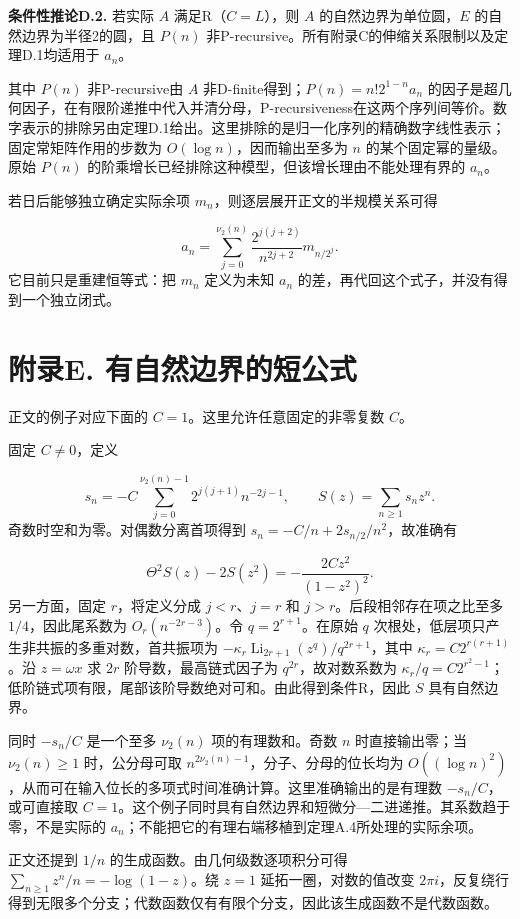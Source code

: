 \documentclass[12pt,a4paper]{article}
\begin{document}
\textbf{条件性推论D.2.} 若实际 $A$ 满足R（$C=L$），则 $A$ 的自然边界为单位圆，$E$ 的自然边界为半径2的圆，且 $P(n)$ 非P-recursive。所有附录C的伸缩关系限制以及定理D.1均适用于 $a_n$。

其中 $P(n)$ 非P-recursive由 $A$ 非D-finite得到；$P(n)=n!2^{1-n}a_n$ 的因子是超几何因子，在有限阶递推中代入并清分母，P-recursiveness在这两个序列间等价。数字表示的排除另由定理D.1给出。这里排除的是归一化序列的精确数字线性表示；固定常矩阵作用的步数为 $O(\log n)$，因而输出至多为 $n$ 的某个固定幂的量级。原始 $P(n)$ 的阶乘增长已经排除这种模型，但该增长理由不能处理有界的 $a_n$。

若日后能够独立确定实际余项 $m_n$，则逐层展开正文的半规模关系可得

\[
a_n=\sum_{j=0}^{\nu_2(n)}\frac{2^{j(j+2)}}{n^{2j+2}}m_{n/2^j}.
\]
它目前只是重建恒等式：把 $m_n$ 定义为未知 $a_n$ 的差，再代回这个式子，并没有得到一个独立闭式。

\section*{附录E. 有自然边界的短公式}
正文的例子对应下面的 $C=1$。这里允许任意固定的非零复数 $C$。

固定 $C\ne0$，定义

\[
s_n=-C\sum_{j=0}^{\nu_2(n)-1}2^{j(j+1)}n^{-2j-1},\qquad S(z)=\sum_{n\ge1}s_nz^n.
\]
奇数时空和为零。对偶数分离首项得到 $s_n=-C/n+2s_{n/2}/n^2$，故准确有

\[
\Theta^2S(z)-2S(z^2)=-\frac{2Cz^2}{(1-z^2)^2}.
\]
另一方面，固定 $r$，将定义分成 $j<r$、$j=r$ 和 $j>r$。后段相邻存在项之比至多 $1/4$，因此尾系数为 $O_r(n^{-2r-3})$。令 $q=2^{r+1}$。在原始 $q$ 次根处，低层项只产生非共振的多重对数，首共振项为 $-\kappa_r\operatorname{Li}_{2r+1}(z^q)/q^{2r+1}$，其中 $\kappa_r=C2^{r(r+1)}$。沿 $z=\omega x$ 求 $2r$ 阶导数，最高链式因子为 $q^{2r}$，故对数系数为 $\kappa_r/q=C2^{r^2-1}$；低阶链式项有限，尾部该阶导数绝对可和。由此得到条件R，因此 $S$ 具有自然边界。

同时 $-s_n/C$ 是一个至多 $\nu_2(n)$ 项的有理数和。奇数 $n$ 时直接输出零；当 $\nu_2(n)\ge1$ 时，公分母可取 $n^{2\nu_2(n)-1}$，分子、分母的位长均为 $O((\log n)^2)$，从而可在输入位长的多项式时间准确计算。这里准确输出的是有理数 $-s_n/C$，或可直接取 $C=1$。这个例子同时具有自然边界和短微分—二进递推。其系数趋于零，不是实际的 $a_n$；不能把它的有理右端移植到定理A.4所处理的实际余项。

正文还提到 $1/n$ 的生成函数。由几何级数逐项积分可得 $\sum_{n\ge1}z^n/n=-\log(1-z)$。绕 $z=1$ 延拓一圈，对数的值改变 $2\pi i$，反复绕行得到无限多个分支；代数函数仅有有限个分支，因此该生成函数不是代数函数。
\end{document}
